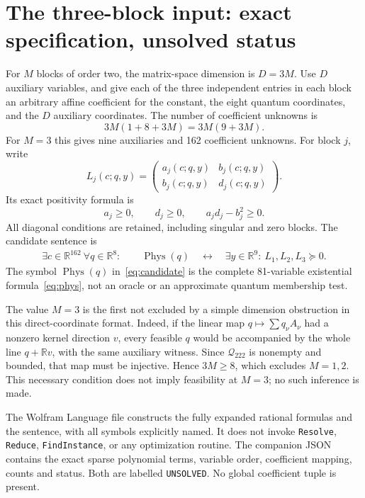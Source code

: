 \documentclass[11pt]{article}
\newcommand{\Q}{{\mathcal Q_{222}}}
\newcommand{\R}{\mathbb R}
\newcommand{\Phys}{\operatorname{Phys}}
\begin{document}
\section{The three-block input: exact specification, unsolved status}
For $M$ blocks of order two, the matrix-space dimension is $D=3M$. Use $D$ auxiliary variables, and give each of the three independent entries in each block an arbitrary affine coefficient for the constant, the eight quantum coordinates, and the $D$ auxiliary coordinates. The number of coefficient unknowns is
\[
 3M(1+8+3M)=3M(9+3M).
\]
For $M=3$ this gives nine auxiliaries and 162 coefficient unknowns. For block $j$, write
\[
 L_j(c;q,y)=\begin{pmatrix}a_j(c;q,y)&b_j(c;q,y)\\
                          b_j(c;q,y)&d_j(c;q,y)\end{pmatrix}.
\]
Its exact positivity formula is
\[
 a_j\ge0,\qquad d_j\ge0,\qquad a_jd_j-b_j^2\ge0.
\]
All diagonal conditions are retained, including singular and zero blocks. The candidate sentence is
\begin{equation}\label{eq:candidate}
 \begin{aligned}
 \exists c\in\R^{162}\ \forall q\in\R^8:\qquad
 \Phys(q)\quad\longleftrightarrow\quad
 \exists y\in\R^9:\
 L_1,L_2,L_3\succeq0.
 \end{aligned}
\end{equation}
The symbol $\Phys(q)$ in~\eqref{eq:candidate} is the complete 81-variable existential formula~\eqref{eq:phys}, not an oracle or an approximate quantum membership test.

The value $M=3$ is the first not excluded by a simple dimension obstruction in this direct-coordinate format. Indeed, if the linear map $q\mapsto\sum q_\nu A_\nu$ had a nonzero kernel direction $v$, every feasible $q$ would be accompanied by the whole line $q+\R v$, with the same auxiliary witness. Since $\Q$ is nonempty and bounded, that map must be injective. Hence $3M\ge8$, which excludes $M=1,2$. This necessary condition does not imply feasibility at $M=3$; no such inference is made.

The Wolfram Language file constructs the fully expanded rational formulas and the sentence, with all symbols explicitly named. It does not invoke \texttt{Resolve}, \texttt{Reduce}, \texttt{FindInstance}, or any optimization routine. The companion JSON contains the exact sparse polynomial terms, variable order, coefficient mapping, counts and status. Both are labelled \texttt{UNSOLVED}. No global coefficient tuple is present.
\end{document}
